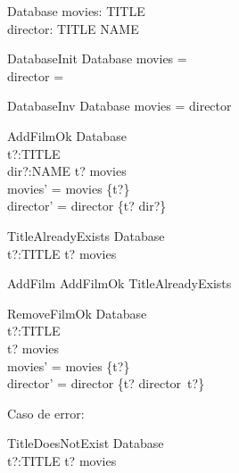 \begin{zed}
\end{zed}

\begin{schema}{Database}
movies: \power TITLE \\
director: TITLE \pfun NAME
\end{schema}

\begin{schema}{DatabaseInit}
Database
\where
movies = \emptyset \\
director = \emptyset
\end{schema}

\begin{schema}{DatabaseInv}
Database
\where
movies = \dom director
\end{schema}

\begin{schema}{AddFilmOk}
\Delta Database \\
t?:TITLE \\
dir?:NAME
\where
t? \notin movies \\
movies' = movies \cup \{t?\} \\
director' = director \cup \{t? \mapsto dir?\}
\end{schema}


\begin{schema}{TitleAlreadyExists}
\Xi Database \\
t?:TITLE
\where
t? \in movies
\end{schema}



\begin{zed}
AddFilm  AddFilmOk \lor TitleAlreadyExists
\end{zed}


\begin{schema}{RemoveFilmOk}
\Delta Database \\
t?:TITLE \\
\where
t? \in movies \\
movies' = movies \setminus \{t?\} \\
director' = director \setminus \{t? \mapsto director~t?\}
\end{schema}

Caso de error:

\begin{schema}{TitleDoesNotExist}
\Xi Database \\
t?:TITLE
\where
t? \notin movies
\end{schema}

